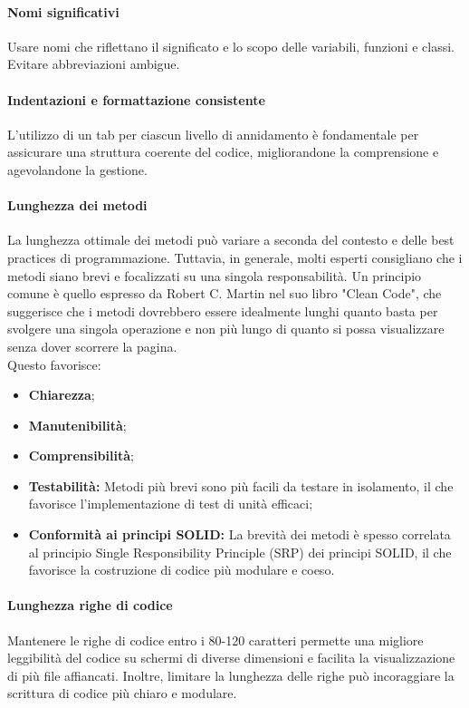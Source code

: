 \documentclass{article}
\begin{document}
\paragraph*{Nomi significativi}
Usare nomi che riflettano il significato e lo scopo delle variabili, funzioni e classi. Evitare abbreviazioni ambigue.
\paragraph*{Indentazioni e formattazione consistente}
L'utilizzo di un tab per ciascun livello di annidamento è fondamentale per assicurare una struttura coerente del codice, migliorandone la comprensione e agevolandone la gestione.
\paragraph*{Lunghezza dei metodi}
La lunghezza ottimale dei metodi può variare a seconda del contesto e delle best practices di programmazione. Tuttavia, in generale, molti esperti consigliano che i metodi siano brevi e focalizzati su una singola responsabilità.
Un principio comune è quello espresso da Robert C. Martin nel suo libro "Clean Code", che suggerisce che i metodi dovrebbero essere idealmente lunghi quanto basta per svolgere una singola operazione e non più lungo di quanto si possa visualizzare senza dover scorrere la pagina. \\
Questo favorisce:
\begin{itemize}
    \item \textbf{Chiarezza};
    \item \textbf{Manutenibilità};
    \item \textbf{Comprensibilità};
    \item \textbf{Testabilità:} Metodi più brevi sono più facili da testare in isolamento, il che favorisce l'implementazione di test di unità efficaci;
    \item \textbf{Conformità ai principi SOLID:} La brevità dei metodi è spesso correlata al principio Single Responsibility Principle (SRP) dei principi SOLID, il che favorisce la costruzione di codice più modulare e coeso.
\end{itemize} 

\paragraph*{Lunghezza righe di codice}
Mantenere le righe di codice entro i 80-120 caratteri permette una migliore leggibilità del codice su schermi di diverse dimensioni e facilita la visualizzazione di più file affiancati.
Inoltre, limitare la lunghezza delle righe può incoraggiare la scrittura di codice più chiaro e modulare.
\end{document}
